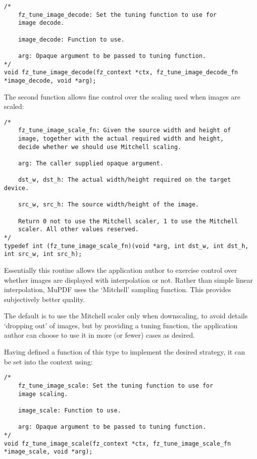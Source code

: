 \documentclass[oneside]{book}
\begin{document}
\begin{lstlisting}
/*
	fz_tune_image_decode: Set the tuning function to use for
	image decode.

	image_decode: Function to use.

	arg: Opaque argument to be passed to tuning function.
*/
void fz_tune_image_decode(fz_context *ctx, fz_tune_image_decode_fn *image_decode, void *arg);
\end{lstlisting}

The second function allows fine control over the scaling used when images are scaled:

\begin{lstlisting}
/*
	fz_tune_image_scale_fn: Given the source width and height of
	image, together with the actual required width and height,
	decide whether we should use Mitchell scaling.

	arg: The caller supplied opaque argument.

	dst_w, dst_h: The actual width/height required on the target device.

	src_w, src_h: The source width/height of the image.

	Return 0 not to use the Mitchell scaler, 1 to use the Mitchell
	scaler. All other values reserved.
*/
typedef int (fz_tune_image_scale_fn)(void *arg, int dst_w, int dst_h, int src_w, int src_h);
\end{lstlisting}

Essentially this routine allows the application author to exercise control over whether images are displayed with interpolation or not. Rather than simple linear interpolation, MuPDF uses the `Mitchell' sampling function. This provides subjectively better quality.

The default is to use the Mitchell scaler only when downscaling, to avoid details `dropping out' of images, but by providing a tuning function, the application author can choose to use it in more (or fewer) cases as desired.

Having defined a function of this type to implement the desired strategy, it can be set into the context using:

\begin{lstlisting}
/*
	fz_tune_image_scale: Set the tuning function to use for
	image scaling.

	image_scale: Function to use.

	arg: Opaque argument to be passed to tuning function.
*/
void fz_tune_image_scale(fz_context *ctx, fz_tune_image_scale_fn *image_scale, void *arg);
\end{lstlisting}
\end{document}
